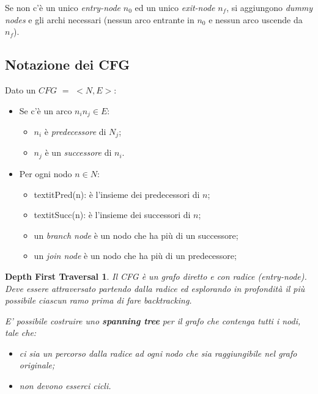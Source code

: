 \documentclass[a4paper, 10pt]{book}
\begin{document}
Se non c'è un unico \textit{entry-node} $n_0$ ed un unico \textit{exit-node} $n_f$, si aggiungono \textit{dummy nodes} e gli archi necessari (nessun arco entrante in $n_0$ e nessun arco uscende da $n_f$).

\subsection{Notazione dei CFG}
Dato un $CFG$ $=$ $<N, E>$:
\begin{itemize}
	\item Se c'è un arco $n_in_j\in E$:
	\begin{itemize}
		\item $n_i$ è \textit{predecessore} di $N_j$;
		\item $n_j$ è un \textit{successore} di $n_i$.
	\end{itemize}
	\item Per ogni nodo $n\in N$:
	\begin{itemize}
		\item textit{Pred(n)}: è l'insieme dei predecessori di $n$;
		\item textit{Succ(n)}: è l'insieme dei successori di $n$;
		\item un \textit{branch node} è un nodo che ha più di un successore;
		\item un \textit{join node} è un nodo che ha più di un predecessore; 
	\end{itemize}
\end{itemize}

\newtheorem*{definit2}{Depth First Traversal}
\begin{definit2}
	Il CFG è un grafo diretto e con radice (entry-node). Deve essere attraversato partendo dalla radice ed esplorando in profondità il più possibile ciascun ramo prima di fare backtracking.
	
	E' possibile costruire uno \textbf{spanning tree} per il grafo che contenga tutti i nodi, tale che:
	\begin{itemize}
		\item ci sia un percorso dalla radice ad ogni nodo che sia raggiungibile nel grafo originale;
		\item non devono esserci cicli.
	\end{itemize}
\end{definit2}
\end{document}
